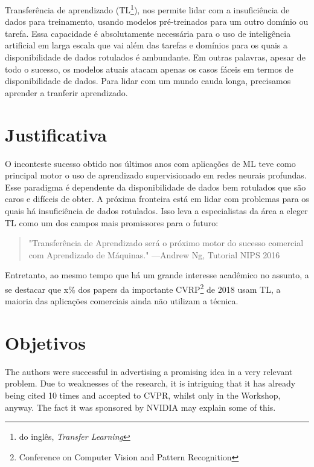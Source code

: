 \documentclass[
12pt, %
a4paper, %
onecolumn, %
]{article}
\begin{document}
Transferência de aprendizado (TL\footnote{do inglês, \textit{Transfer Learning}}), nos permite lidar com a insuficiência de dados para treinamento, usando modelos pré-treinados para um outro domínio ou tarefa. Essa capacidade é absolutamente necessária para o uso de inteligência artificial em larga escala que vai além das tarefas e domínios para os quais a disponibilidade de dados rotulados é ambundante. Em outras palavras, apesar de todo o sucesso, os modelos atuais atacam apenas os casos fáceis em termos de disponibilidade de dados. Para lidar com um mundo cauda longa, precisamos aprender a tranferir aprendizado.


\section{Justificativa}
O inconteste sucesso obtido nos últimos anos com aplicações de ML teve como principal motor o uso de aprendizado supervisionado em redes neurais profundas. Esse paradigma é dependente da disponibilidade de dados bem rotulados que são caros e difíceis de obter. A próxima fronteira está em lidar com problemas para os quais há insuficiência de dados rotulados. Isso leva a especialistas da área a eleger TL como um dos campos mais promissores para o futuro:
\begin{quote} "Transferência de Aprendizado será o próximo motor do sucesso comercial com Aprendizado de Máquinas." \hfill ---Andrew Ng, Tutorial NIPS 2016 \cite{ANg}
\end{quote}

Entretanto, ao mesmo tempo que há um grande interesse acadêmico no assunto, a se destacar que x\% dos papers da importante CVRP\footnote{Conference on Computer Vision and Pattern Recognition} de 2018 usam TL, 
a maioria das aplicações comerciais ainda não utilizam a técnica. 




\section{Objetivos}

The authors were successful in advertising a promising idea in a very relevant problem.  Due to weaknesses of the research, it is intriguing that it has already being cited 10 times and accepted to CVPR, whilst only in the Workshop, anyway. The fact it was sponsored by NVIDIA may explain some of this.
\end{document}
